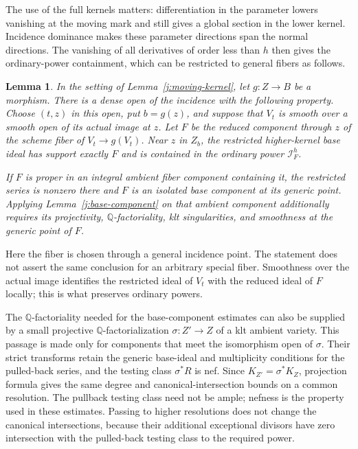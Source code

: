 \documentclass[12pt,a4paper,psamsfonts]{amsart}
\theoremstyle{definition}
\theoremstyle{plain}
\newtheorem{lemma}{Lemma}[section]
\newcommand{\Q}{\mathbb Q}
\begin{document}
The use of the full kernels matters: differentiation in the
parameter lowers vanishing at the moving mark and still gives a
global section in the lower kernel.  Incidence dominance makes
these parameter directions span the normal directions.  The
vanishing of all derivatives of order less than $h$ then gives
the ordinary-power containment, which can be restricted to
general fibers as follows.

\begin{lemma}
\label{j:fiber-restriction}
In the setting of Lemma~\ref{j:moving-kernel}, let $g:Z\to B$ be
a morphism.  There is a dense open of the incidence with the
following property.  Choose $(t,z)$ in this open, put $b=g(z)$,
and suppose that $V_t$ is smooth over a smooth open of its actual
image at $z$.  Let $F$ be the reduced component through $z$ of
the scheme fiber of $V_t\to g(V_t)$.  Near $z$ in $Z_b$, the
restricted higher-kernel base ideal has support exactly $F$ and
is contained in the ordinary power $\mathcal I_F^h$.

If $F$ is proper in an integral ambient fiber component containing
it, the restricted series is nonzero there and $F$ is an isolated
base component at its generic point.  Applying
Lemma~\ref{j:base-component} on that ambient component additionally
requires its projectivity, $\Q$-factoriality, klt singularities,
and smoothness at the generic point of $F$.
\end{lemma}

Here the fiber is chosen through a general incidence point.  The
statement does not assert the same conclusion for an arbitrary
special fiber.  Smoothness over the actual image identifies the
restricted ideal of $V_t$ with the reduced ideal of $F$ locally;
this is what preserves ordinary powers.

The $\Q$-factoriality needed for the base-component estimates can
also be supplied by a small projective $\Q$-factorialization
$\sigma:Z'\to Z$ of a klt ambient variety.  This passage is made
only for components that meet the isomorphism open of $\sigma$.
Their strict transforms retain the generic base-ideal and
multiplicity conditions for the pulled-back series, and the
testing class $\sigma^*R$ is nef.  Since
$K_{Z'}=\sigma^*K_Z$, projection formula gives the same degree
and canonical-intersection bounds on a common resolution.
The pullback testing class need not be ample; nefness is the
property used in these estimates.  Passing to higher resolutions
does not change the canonical intersections, because their
additional exceptional divisors have zero intersection with
the pulled-back testing class to the required power.
\end{document}
